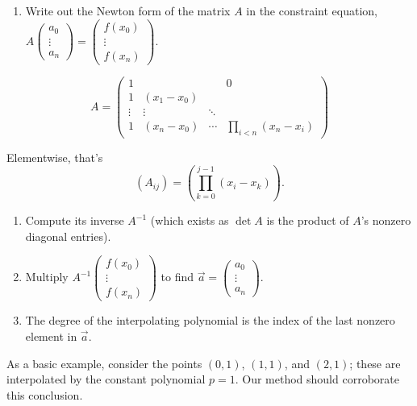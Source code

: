 \documentclass{article}
\providecommand{\tightlist}{%
      \setlength{\itemsep}{0pt}\setlength{\parskip}{0pt}}
\begin{document}
\begin{enumerate}
\def\labelenumi{\arabic{enumi}.}
\tightlist
\item
  Write out the Newton form of the matrix \(A\) in the constraint
  equation,
  \(A \begin{pmatrix}a_0\\ \vdots\\ a_n\end{pmatrix} = \begin{pmatrix}f(x_0)\\ \vdots\\ f(x_n)\end{pmatrix}\).
\end{enumerate}

\[A = \begin{pmatrix} 1 & & & 0\\
                       1 &(x_1 - x_0) & & \\
                       \vdots & \vdots & \ddots & \\
                       1 &(x_n - x_0) &\cdots &\prod_{i<n}(x_n - x_i)
       \end{pmatrix}\]

Elementwise, that's
\[(A_{ij}) = \left(\prod_{k=0}^{j-1} (x_i - x_k)\right).\]

\begin{enumerate}
\def\labelenumi{\arabic{enumi}.}
\setcounter{enumi}{1}
\item
  Compute its inverse \(A^{-1}\) (which exists as \(\det A\) is the
  product of \(A\)'s nonzero diagonal entries).
\item
  Multiply
  \(A^{-1} \begin{pmatrix}f(x_0)\\ \vdots\\ f(x_n)\end{pmatrix}\) to
  find \(\vec{a} = \begin{pmatrix}a_0\\ \vdots\\ a_n\end{pmatrix}\).
\item
  The degree of the interpolating polynomial is the index of the last
  nonzero element in \(\vec{a}\).
\end{enumerate}

As a basic example, consider the points \((0,1)\), \((1,1)\), and
\((2,1)\); these are interpolated by the constant polynomial \(p = 1\).
Our method should corroborate this conclusion.
\end{document}
